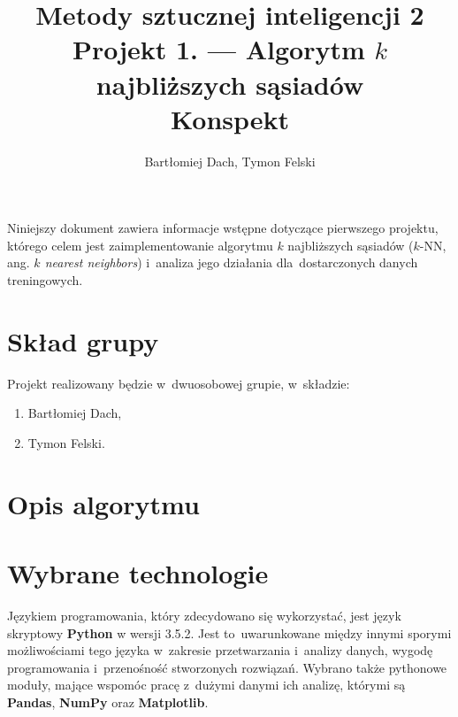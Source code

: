 \documentclass[12pt,a4paper]{article}
\begin{document}
\title{Metody sztucznej inteligencji 2 \\
\Large{
    Projekt 1. --- Algorytm $k$ najbliższych sąsiadów \\
    Konspekt
}}
\author{Bartłomiej Dach, Tymon Felski}
\maketitle

\noindent
Niniejszy dokument zawiera informacje wstępne dotyczące pierwszego projektu, którego celem jest zaimplementowanie algorytmu $k$ najbliższych sąsiadów ($k$-NN, ang. \emph{$k$ nearest neighbors}) i~analiza jego działania dla~dostarczonych danych treningowych.

\section{Skład grupy}

Projekt realizowany będzie w~dwuosobowej grupie, w~składzie:

\begin{enumerate}
    \item Bartłomiej Dach,
    \item Tymon Felski.
\end{enumerate}

\section{Opis algorytmu}

\section{Wybrane technologie}
Językiem programowania, który zdecydowano się wykorzystać, jest język skryptowy \textbf{Python} w wersji 3.5.2. Jest to~uwarunkowane między innymi sporymi możliwościami tego języka w~zakresie przetwarzania i~analizy danych, wygodę programowania i~przenośność stworzonych rozwiązań. Wybrano także pythonowe moduły, mające wspomóc pracę z~dużymi danymi ich analizę, którymi są \textbf{Pandas}, \textbf{NumPy} oraz \textbf{Matplotlib}.\\
\end{document}
